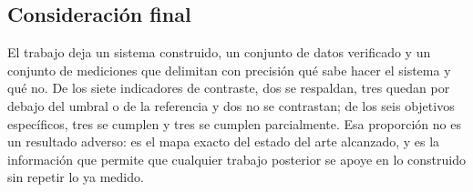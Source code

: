 \subsection{Consideración final}

El trabajo deja un sistema construido, un conjunto de datos verificado y un
conjunto de mediciones que delimitan con precisión qué sabe hacer el sistema y
qué no. De los siete indicadores de contraste, dos se respaldan, tres quedan por
debajo del umbral o de la referencia y dos no se contrastan; de los seis objetivos
específicos, tres se cumplen y tres se cumplen parcialmente. Esa proporción no es un resultado adverso: es el
mapa exacto del estado del arte alcanzado, y es la información que permite que
cualquier trabajo posterior se apoye en lo construido sin repetir lo ya medido.
